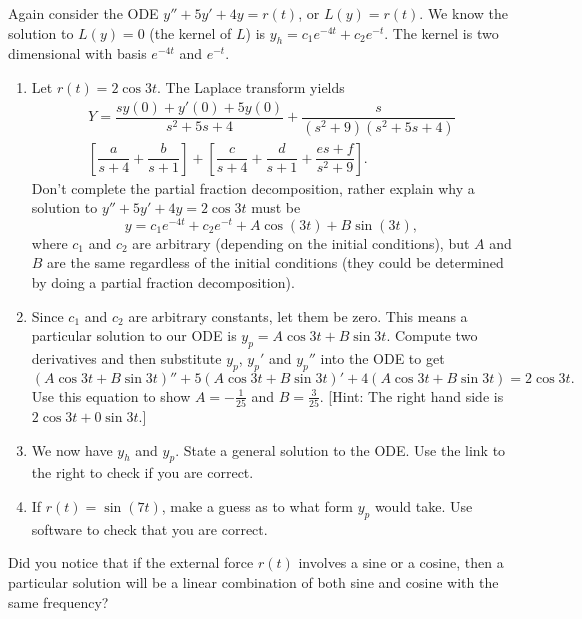 \begin{problem}
Again consider the ODE $y''+5y'+4y=r(t)$, or $L(y)=r(t)$. We know the solution to $L(y)=0$ (the kernel of $L$) is $y_h = c_1 e^{-4t}+c_2e^{-t}$. The kernel is two dimensional with basis $e^{-4t}$ and $e^{-t}$.
\begin{enumerate}
 \item Let $r(t)=2\cos 3t$.  The Laplace transform yields
\begin{align*}
Y=
\dfrac{sy(0)+y'(0)+5y(0)}{s^2+5s+4}
+\dfrac{s}{(s^2+9)(s^2+5s+4)}
\\
\left[\dfrac{a}{s+4}+
\dfrac{b}{s+1}\right]+
\left[\dfrac{c}{s+4}+
\dfrac{d}{s+1}+
\dfrac{es+f}{s^2+9}
\right]
.
\end{align*}
 Don't complete the partial fraction decomposition, rather explain why a solution to 
$y''+5y'+4y=2\cos 3t$ must be 
$$y=c_1 e^{-4t}+c_2e^{-t}+A\cos(3t)+B\sin(3t),$$ where $c_1$ and $c_2$ are arbitrary
 (depending on the initial conditions), but $A$ and $B$ are the same regardless of the initial conditions (they could be determined by doing a partial fraction decomposition).
 \item Since $c_1$ and $c_2$ are arbitrary constants, let them be zero. This means a particular solution to our ODE is $y_p=A\cos 3t+B\sin 3t$. Compute two derivatives and then substitute $y_p$, $y_p'$ and $y_p''$ into the ODE to get
$$
(A\cos 3t+B\sin 3t)'' + 5(A\cos 3t+B\sin 3t)'+4(A\cos 3t+B\sin 3t)=2\cos 3t
.$$ 
Use this equation to show $A = -\frac{1}{25}$ and $B=\frac{3}{25}$. [Hint: The right hand side is $2\cos 3t+0\sin 3t$.]
 \item We now have $y_h$ and $y_p$. State a general solution to the ODE. Use the link to the right to check if you are correct.  
 \item If $r(t) = \sin(7t)$, make a guess as to what form $y_p$ would take.  Use software to check that you are correct. 
\end{enumerate}

\end{problem}

Did you notice that if the external force $r(t)$ involves a sine or a cosine, then a particular solution will be a linear combination of both sine and cosine with the same frequency?

